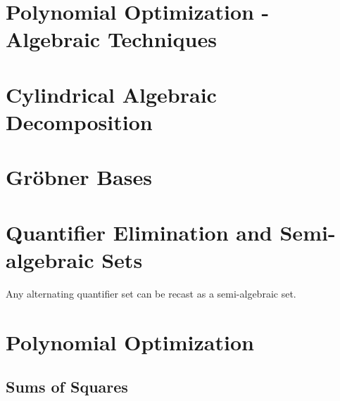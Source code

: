 

\section{Polynomial Optimization - Algebraic Techniques}

\section{Cylindrical Algebraic Decomposition}


\section{Gr\"obner Bases}

\section{Quantifier Elimination and Semi-algebraic Sets}

\begin{theorem}{}{}
Any alternating quantifier set can be recast as a semi-algebraic set.
\end{theorem}

\section{Polynomial Optimization}


\subsection{Sums of Squares}











